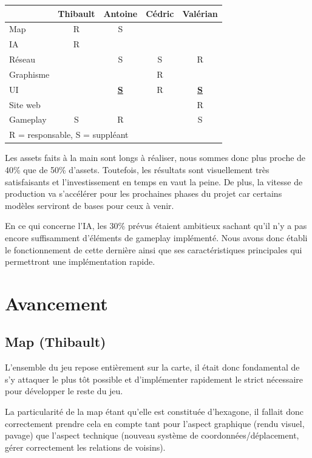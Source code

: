 \documentclass[12pt]{report}
\begin{document}
\begin{center}
    \begin{tabular}{@{} l *4c @{}}
        \toprule
        \multicolumn{1}{c}{}    & \textbf{Thibault}  & \textbf{Antoine}  & \textbf{Cédric} & \textbf{Valérian} \\ 
        \midrule
        Map & R & S & & \\
        IA & R & & & \\
        Réseau & & S & S & R \\
        Graphisme & & & R & \\
        UI & & \underline{\textbf S} & R & \underline{\textbf S} \\
        Site web & & & & R \\
        Gameplay & S & R & & S\\
        \bottomrule
        \multicolumn{4}{l}{\footnotesize R = responsable, S = suppléant}\\
    \end{tabular}
\end{center}

Les assets faits à la main sont longs à réaliser, nous sommes donc plus proche de 40\% que de 50\% d'assets. Toutefois, les résultats sont visuellement très satisfaisants et l'investissement en temps en vaut la peine. De plus, la vitesse de production va s'accélérer pour les prochaines phases du projet car certains modèles serviront de bases pour ceux à venir.

 En ce qui concerne l'IA, les 30\% prévus étaient ambitieux sachant qu'il n'y a pas encore suffisamment d'éléments de gameplay implémenté. Nous avons donc établi le fonctionnement de cette dernière ainsi que ses caractéristiques principales qui permettront une implémentation rapide.

\chapter{Avancement}

\section{Map (Thibault)}

L’ensemble du jeu repose entièrement sur la carte, il était donc fondamental de s’y attaquer le plus tôt possible et d’implémenter rapidement le strict nécessaire pour développer le reste du jeu.

La particularité de la map étant qu’elle est constituée d’hexagone, il fallait donc correctement prendre cela en compte tant pour l’aspect graphique (rendu visuel, pavage) que l’aspect technique (nouveau système de coordonnées/déplacement, gérer correctement les relations de voisins).
\end{document}
